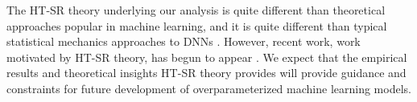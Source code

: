 \documentclass{article}
\begin{document}
The HT-SR theory underlying our analysis is quite different than theoretical approaches popular in machine learning, and it is quite different than typical statistical mechanics approaches to DNNs \citep{BKPx20}.
%
%
However, recent work, work motivated by HT-SR theory, has begun to appear
\citep{HodMah20A_TR,GSZ20_TR, ZCM20_TR, DLM19_Exact_TR, TKM20_TR, LEHM21_TR,Mah12, DKM20_TR}. 
We expect that the empirical results and theoretical insights HT-SR theory provides will provide guidance and constraints for future development of overparameterized machine learning models.





\end{document}
